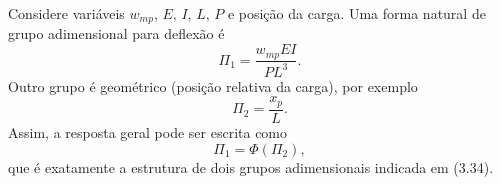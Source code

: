 Considere variáveis $w_{mp}$, $E$, $I$, $L$, $P$ e posição da carga. Uma forma natural de grupo adimensional para deflexão é
\[
\Pi_1 = \frac{w_{mp}EI}{PL^3}.
\]
Outro grupo é geométrico (posição relativa da carga), por exemplo
\[
\Pi_2 = \frac{x_p}{L}.
\]
Assim, a resposta geral pode ser escrita como
\[
\Pi_1 = \Phi(\Pi_2),
\]
que é exatamente a estrutura de dois grupos adimensionais indicada em (3.34).

